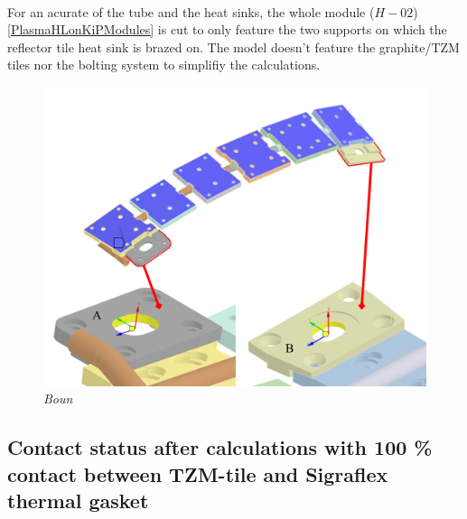 \\
\normalsize{\indent For an acurate of the tube and the heat sinks, the whole module ($H-02$) \ref{PlasmaHLonKiPModules} is cut to only feature the two supports on which the reflector tile heat sink is brazed on. The model doesn't feature the graphite/\acrshort{TZM} tiles nor the bolting system to simplifiy the calculations.}
\begin{figure}[!ht]
    \label{fig_5_15} 
    \centering
    \includegraphics[width=1\textwidth]{figures/one3rdOfModule.png}
    \caption{\it Boun}
\end{figure}
\subsection{Contact status after calculations with 100 \% contact between TZM-tile and Sigraflex thermal gasket}
